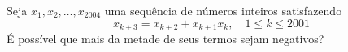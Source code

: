Seja $x_1, x_2, \dots, x_{2004}$ uma sequência de números inteiros satisfazendo
$$ x_{k+3} = x_{k+2} + x_{k+1} x_k, \quad 1 \le k \le 2001$$
É possível que mais da metade de seus termos sejam negativos?